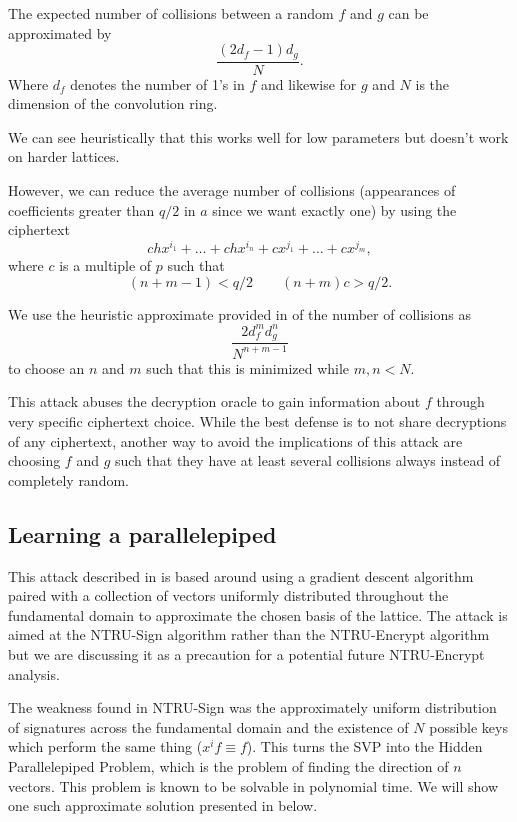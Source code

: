 \documentclass[12pt]{amsart}
\theoremstyle{definition}
\theoremstyle{remark}
\begin{document}
The expected number of collisions between a random $f$ and $g$ can be approximated by 
$$\frac{(2d_f-1)d_g}{N}.$$
Where $d_f$ denotes the number of 1's in $f$ and likewise for $g$ and $N$ is the dimension of the convolution ring. 

We can see heuristically that this works well for low parameters but doesn't work on harder lattices.

However, we can reduce the average number of collisions (appearances of coefficients greater than $q/2$ in $a$ since we want exactly one) by using the ciphertext 
$$chx^{i_1}+\dots + chx^{i_n} + cx^{j_1} + \dots + cx^{j_m},$$
where $c$ is a multiple of $p$ such that 
$$(n+m-1) < q/2 \qquad (n+m)c > q/2.$$

We use the heuristic approximate provided in \cite{ChosenCipherAttack} of the number of collisions as
$$\frac{2d_f^md_g^n}{N^{n+m-1}}$$
to choose an $n$ and $m$ such that this is minimized while $m,n < N$.

This attack abuses the decryption oracle to gain information about $f$ through very specific ciphertext choice.  While the best defense is to not share decryptions of any ciphertext, another way to avoid the implications of this attack are choosing $f$ and $g$ such that they have at least several collisions always instead of completely random.

\subsection{Learning a parallelepiped} 
This attack described in \cite{LearningAttack} is based around using a gradient descent algorithm paired with a collection of vectors uniformly distributed throughout the fundamental domain to approximate the chosen basis of the lattice. The attack is aimed at the NTRU-Sign algorithm rather than the NTRU-Encrypt algorithm but we are discussing it as a precaution for a potential future NTRU-Encrypt analysis.

The weakness found in NTRU-Sign was the approximately uniform distribution of signatures across the fundamental domain and the existence of $N$ possible keys which perform the same thing ($x^if \equiv f$). This turns the SVP into the Hidden Parallelepiped Problem, which is the problem of finding the direction of $n$ vectors. This problem is known to be solvable in polynomial time. We will show one such approximate solution presented in \cite{LearningAttack} below.\\
\end{document}
